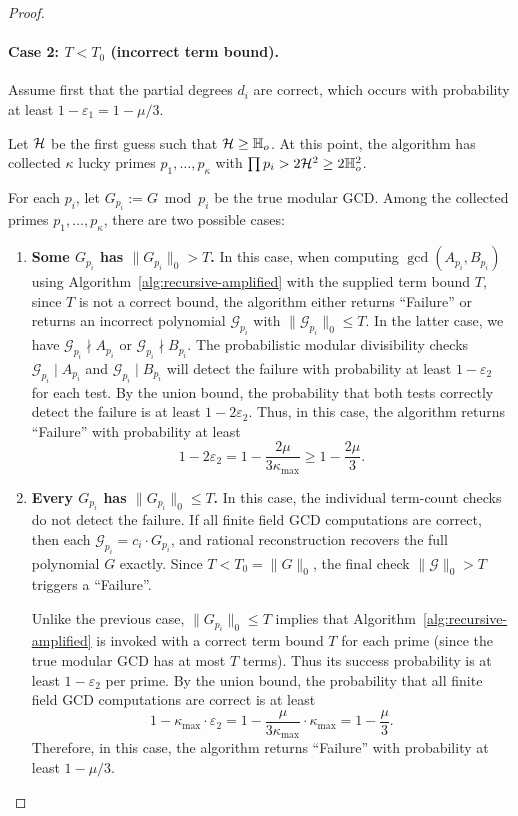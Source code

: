\documentclass{article}
\numberwithin{equation}{section}
\begin{document}
\begin{proof}
\paragraph{Case 2: $T < T_0$ (incorrect term bound).}

Assume first that the partial degrees $d_i$ are correct, which occurs with probability at least $1 - \varepsilon_1 = 1 - \mu/3$.

Let ${\mathcal{H}}$ be the first guess such that ${\mathcal{H}} \ge \mathbb{H}_{o}$. At this point, the algorithm has collected $\kappa$ lucky primes $p_1,\dots,p_\kappa$ with $\prod p_i > 2{\mathcal{H}}^2 \ge 2\mathbb{H}_{o}^2$.

For each $p_i$, let $G_{p_i} := G \bmod p_i$ be the true modular GCD. Among the collected primes $p_1,\dots,p_{\kappa}$, there are two possible cases:

\begin{enumerate}
   \item \textbf{Some $G_{p_i}$ has $\|G_{p_i}\|_0 > T$.} 
%
In this case, when computing $\gcd(A_{p_i}, B_{p_i})$ using Algorithm~\ref{alg:recursive-amplified} with the supplied term bound $T$, since $T$ is not a correct bound, the algorithm either returns ``Failure'' or returns an incorrect polynomial $\mathcal{G}_{p_i}$ with $\|\mathcal{G}_{p_i}\|_0 \le T$. In the latter case, we have $\mathcal{G}_{p_i} \nmid A_{p_i}$ or $\mathcal{G}_{p_i} \nmid B_{p_i}$. The probabilistic modular divisibility checks $\mathcal{G}_{p_i} \mid A_{p_i}$ and $\mathcal{G}_{p_i} \mid B_{p_i}$ will detect the failure with probability at least $1 - \varepsilon_2$ for each test. By the union bound, the probability that both tests correctly detect the failure is at least $1 - 2\varepsilon_2$. Thus, in this case, the algorithm returns ``Failure'' with probability at least 
\[
1 - 2\varepsilon_2 = 1 - \frac{2\mu}{3\kappa_{\max}} \ge 1 - \frac{2\mu}{3}.
\]

\item \textbf{Every $G_{p_i}$ has $\|G_{p_i}\|_0 \le T$.} 
%
In this case, the individual term-count checks do not detect the failure. If all finite field GCD computations are correct, then each $\mathcal{G}_{p_i} = c_i \cdot G_{p_i}$, and rational reconstruction recovers the full polynomial $G$ exactly. Since $T < T_0 = \|G\|_0$, the final check $\|\mathcal{G}\|_0 > T$ triggers a ``Failure''.

Unlike the previous case, $\|G_{p_i}\|_0 \le T$ implies that Algorithm~\ref{alg:recursive-amplified} is invoked with a correct term bound $T$ for each prime (since the true modular GCD has at most $T$ terms). Thus its success probability is at least $1 - \varepsilon_2$ per prime. By the union bound, the probability that all finite field GCD computations are correct is at least
\[
1 - \kappa_{\max} \cdot \varepsilon_2 = 1 - \frac{\mu}{3\kappa_{\max}} \cdot \kappa_{\max} = 1 - \frac{\mu}{3}.
\]
Therefore, in this case, the algorithm returns ``Failure'' with probability at least $1 - \mu/3$.



\end{enumerate}
\end{proof}
\end{document}
